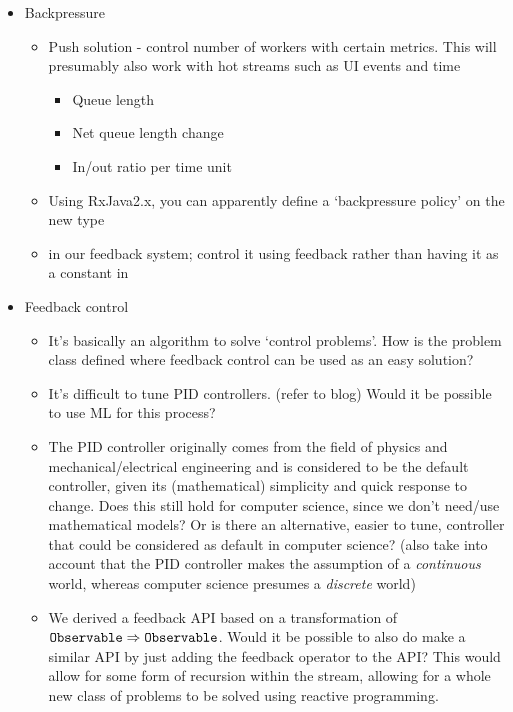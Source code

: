 \begin{itemize}
	\item Backpressure
	\begin{itemize}
		\item Push solution - control number of workers with certain metrics. This will presumably also work with hot streams such as UI events and time
		\begin{itemize}
			\item Queue length
			\item Net queue length change
			\item In/out ratio per time unit
		\end{itemize}
		\item Using RxJava2.x, you can apparently define a `backpressure policy' on the new  type
		\item {} in our feedback system; control it using feedback rather than having it as a constant in 
	\end{itemize}
	\item Feedback control
	\begin{itemize}
		\item It’s basically an algorithm to solve ‘control problems’. How is the problem class defined where feedback control can be used as an easy solution?
		\item It’s difficult to tune PID controllers. (refer to blog) Would it be possible to use ML for this process?
		\item The PID controller originally comes from the field of physics and mechanical/electrical engineering and is considered to be the default controller, given its (mathematical) simplicity and quick response to change. Does this still hold for computer science, since we don’t need/use mathematical models? Or is there an alternative, easier to tune, controller that could be considered as default in computer science? (also take into account that the PID controller makes the assumption of a \textit{continuous} world, whereas computer science presumes a \textit{discrete} world)
		\item We derived a feedback API based on a transformation of $\texttt{Observable} \Rightarrow \texttt{Observable}$. Would it be possible to also do make a similar API by just adding the feedback operator to the \obs API? This would allow for some form of recursion within the stream, allowing for a whole new class of problems to be solved using reactive programming.
	\end{itemize}
\end{itemize}
